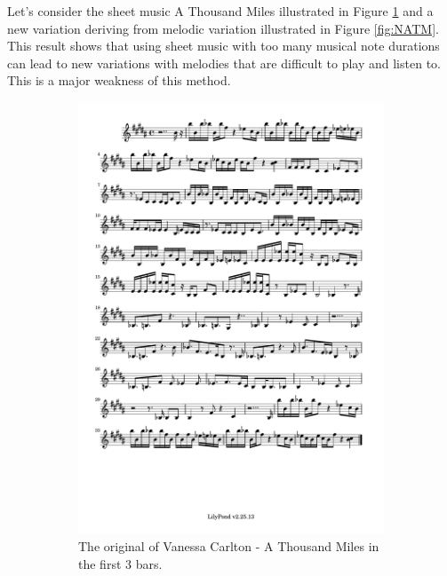 \documentclass[11pt]{article}
\theoremstyle{definition}
\begin{document}
Let's consider the sheet music A Thousand Miles \cite{carlton2009thousandmiles} illustrated in Figure \ref{fig:OATM} and a new variation deriving from melodic variation illustrated in Figure \ref{fig:NATM}. This result shows that using sheet music with too many musical note durations can lead to new variations with melodies that are difficult to play and listen to. This is a major weakness of this method.

\begin{figure}
\begin{subfigure}{\textwidth}
\centering
\includegraphics[trim=1cm 26.5cm 1cm 0.5cm, clip, scale=0.8]{Original_ATM.pdf}
\caption{The original of Vanessa Carlton - A Thousand Miles in the first 3 bars.} 
\label{fig:OATM}
\end{subfigure}
\begin{subfigure}{\textwidth}
\centering

\end{subfigure}
\end{figure}
\end{document}
